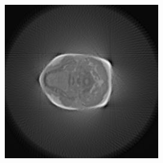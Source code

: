 \begin{figure}[ht]
\begin{minipage}[c]{0.3\linewidth}
            \end{minipage}
            \begin{minipage}[c]{0.3\linewidth}
                \centering
                \includegraphics[width=\textwidth]{Files/report_images/SUM_backprojections_k11.jpg}
            \end{minipage}


\end{figure}

